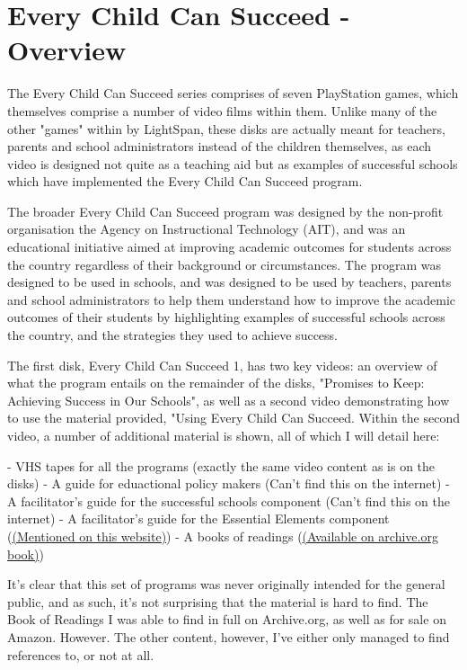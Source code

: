 \chapter{Every Child Can Succeed - Overview}

The Every Child Can Succeed series comprises of seven PlayStation games, which themselves comprise a number of video films within them. Unlike many of the other "games" within by LightSpan, these disks are actually meant for teachers, parents and school administrators instead of the children themselves, as each video is designed not quite as a teaching aid but as examples of successful schools which have implemented the Every Child Can Succeed program.

The broader Every Child Can Succeed program was designed by the non-profit organisation the Agency on Instructional Technology (AIT), and was an educational initiative aimed at improving academic outcomes for students across the country regardless of their background or circumstances. The program was designed to be used in schools, and was designed to be used by teachers, parents and school administrators to help them understand how to improve the academic outcomes of their students by highlighting examples of successful schools across the country, and the strategies they used to achieve success.

The first disk, Every Child Can Succeed 1, has two key videos: an overview of what the program entails on the remainder of the disks, "Promises to Keep: Achieving Success in Our Schools", as well as a second video demonstrating how to use the material provided, "Using Every Child Can Succeed. Within the second video, a number of additional material is shown, all of which I will detail here:

- VHS tapes for all the programs (exactly the same video content as is on the disks)
- A guide for eduactional policy makers (Can't find this on the internet)
- A facilitator's guide for the successful schools component (Can't find this on the internet)
- A facilitator's guide for the Essential Elements component (\href{https://www.gettextbooks.co.uk/isbn/9780784206027/}{(Mentioned on this website)})
- A books of readings (\href{https://archive.org/details/everychildcansuc0000unse}{(Available on archive.org book)})

It's clear that this set of programs was never originally intended for the general public, and as such, it's not surprising that the material is hard to find. The Book of Readings I was able to find in full on Archive.org, as well as for sale on Amazon. However. The other content, however, I've either only managed to find references to, or not at all.

